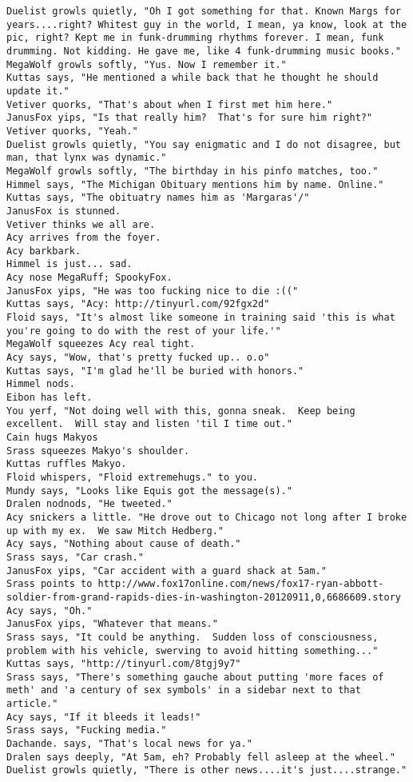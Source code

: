 \begin{verbatim}
Duelist growls quietly, "Oh I got something for that. Known Margs for years....right? Whitest guy in the world, I mean, ya know, look at the pic, right? Kept me in funk-drumming rhythms forever. I mean, funk drumming. Not kidding. He gave me, like 4 funk-drumming music books."
MegaWolf growls softly, "Yus. Now I remember it."
Kuttas says, "He mentioned a while back that he thought he should update it."
Vetiver quorks, "That's about when I first met him here."
JanusFox yips, "Is that really him?  That's for sure him right?"
Vetiver quorks, "Yeah."
Duelist growls quietly, "You say enigmatic and I do not disagree, but man, that lynx was dynamic."
MegaWolf growls softly, "The birthday in his pinfo matches, too."
Himmel says, "The Michigan Obituary mentions him by name. Online."
Kuttas says, "The obituatry names him as 'Margaras'/"
JanusFox is stunned.
Vetiver thinks we all are.
Acy arrives from the foyer.
Acy barkbark.
Himmel is just... sad.
Acy nose MegaRuff; SpookyFox.
JanusFox yips, "He was too fucking nice to die :(("
Kuttas says, "Acy: http://tinyurl.com/92fgx2d"
Floid says, "It's almost like someone in training said 'this is what you're going to do with the rest of your life.'"
MegaWolf squeezes Acy real tight.
Acy says, "Wow, that's pretty fucked up.. o.o"
Kuttas says, "I'm glad he'll be buried with honors."
Himmel nods.
Eibon has left.
You yerf, "Not doing well with this, gonna sneak.  Keep being excellent.  Will stay and listen 'til I time out."
Cain hugs Makyos
Srass squeezes Makyo's shoulder.
Kuttas ruffles Makyo.
Floid whispers, "Floid extremehugs." to you.
Mundy says, "Looks like Equis got the message(s)."
Dralen nodnods, "He tweeted."
Acy snickers a little. "He drove out to Chicago not long after I broke up with my ex.  We saw Mitch Hedberg."
Acy says, "Nothing about cause of death."
Srass says, "Car crash."
JanusFox yips, "Car accident with a guard shack at 5am."
Srass points to http://www.fox17online.com/news/fox17-ryan-abbott-soldier-from-grand-rapids-dies-in-washington-20120911,0,6686609.story
Acy says, "Oh."
JanusFox yips, "Whatever that means."
Srass says, "It could be anything.  Sudden loss of consciousness, problem with his vehicle, swerving to avoid hitting something..."
Kuttas says, "http://tinyurl.com/8tgj9y7"
Srass says, "There's something gauche about putting 'more faces of meth' and 'a century of sex symbols' in a sidebar next to that article."
Acy says, "If it bleeds it leads!"
Srass says, "Fucking media."
Dachande. says, "That's local news for ya."
Dralen says deeply, "At 5am, eh? Probably fell asleep at the wheel."
Duelist growls quietly, "There is other news....it's just....strange."

\end{verbatim}
